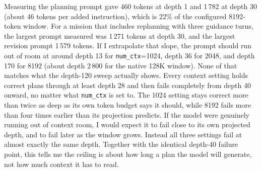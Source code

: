 Measuring the planning prompt gave 460 tokens at depth 1 and 1\,782 at depth 30
(about 46 tokens per added instruction), which is 22\% of the configured
8192-token window. For a mission that includes replanning with three guidance
turns, the largest prompt measured was 1\,271 tokens at depth 30, and the
largest revision prompt 1\,579 tokens. If I extrapolate that slope, the prompt
should run out of room at around depth 13 for \texttt{num\_ctx}=1024, depth 36
for 2048, and depth 170 for 8192 (about depth 2\,800 for the native 128K
window). None of that matches what the depth-120 sweep actually shows. Every
context setting holds correct plans through at least depth 28 and then fails
completely from depth 40 onward, no matter what \texttt{num\_ctx} is set to.
The 1024 setting stays correct more than twice as deep as its own token budget
says it should, while 8192 fails more than four times earlier than its
projection predicts. If the model were genuinely running out of context room,
I would expect it to fail close to its own projected depth, and to fail later
as the window grows. Instead all three settings fail at almost exactly the
same depth. Together with the identical depth-40 failure point, this tells me
the ceiling is about how long a plan the model will generate, not how much
context it has to read.


